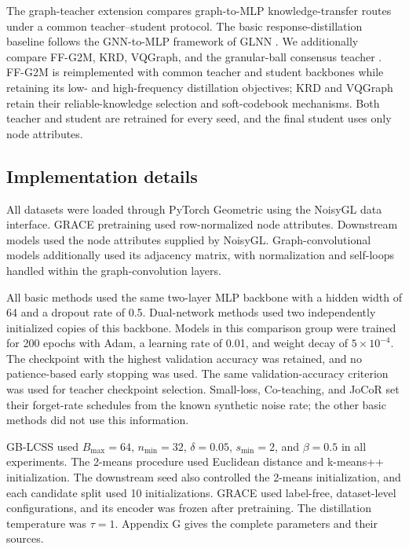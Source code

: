 \documentclass[10pt,letterpaper]{elsarticle}
\begin{document}
The graph-teacher extension compares graph-to-MLP knowledge-transfer routes under a common teacher--student protocol. The basic response-distillation baseline follows the GNN-to-MLP framework of GLNN \cite{ref3}. We additionally compare FF-G2M, KRD, VQGraph, and the granular-ball consensus teacher \cite{ref6,ref7,ref26}. FF-G2M is reimplemented with common teacher and student backbones while retaining its low- and high-frequency distillation objectives; KRD and VQGraph retain their reliable-knowledge selection and soft-codebook mechanisms. Both teacher and student are retrained for every seed, and the final student uses only node attributes.

\subsection{Implementation details}\label{sec:4.4}

All datasets were loaded through PyTorch Geometric using the NoisyGL data interface. GRACE pretraining used row-normalized node attributes. Downstream models used the node attributes supplied by NoisyGL. Graph-convolutional models additionally used its adjacency matrix, with normalization and self-loops handled within the graph-convolution layers.

All basic methods used the same two-layer MLP backbone with a hidden width of 64 and a dropout rate of 0.5. Dual-network methods used two independently initialized copies of this backbone. Models in this comparison group were trained for 200 epochs with Adam, a learning rate of 0.01, and weight decay of \(5 \times 10^{- 4}\). The checkpoint with the highest validation accuracy was retained, and no patience-based early stopping was used. The same validation-accuracy criterion was used for teacher checkpoint selection. Small-loss, Co-teaching, and JoCoR set their forget-rate schedules from the known synthetic noise rate; the other basic methods did not use this information.

GB-LCSS used \(B_{\max} = 64\), \(n_{\min} = 32\), \(\delta = 0.05\), \(s_{\min} = 2\), and \(\beta = 0.5\) in all experiments. The 2-means procedure used Euclidean distance and k-means++ initialization. The downstream seed also controlled the 2-means initialization, and each candidate split used 10 initializations. GRACE used label-free, dataset-level configurations, and its encoder was frozen after pretraining. The distillation temperature was \(\tau = 1\). Appendix G gives the complete parameters and their sources.
\end{document}

